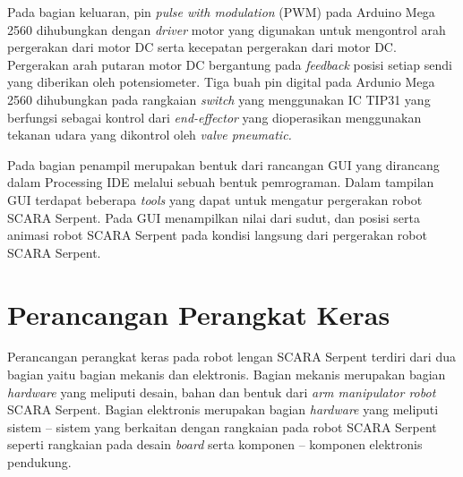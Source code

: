 Pada bagian keluaran, pin \textit{pulse with modulation} (PWM) pada Arduino Mega 2560 dihubungkan dengan \textit{driver} motor yang digunakan untuk mengontrol arah pergerakan dari motor DC serta kecepatan pergerakan dari motor DC. Pergerakan arah putaran motor DC bergantung pada \textit{feedback} posisi setiap sendi yang diberikan oleh potensiometer. Tiga buah pin digital pada Ardunio Mega 2560 dihubungkan pada rangkaian \textit{switch} yang menggunakan IC TIP31 yang berfungsi sebagai kontrol dari \textit{end-effector} yang dioperasikan menggunakan tekanan udara yang dikontrol oleh \textit{valve pneumatic.}

Pada bagian penampil merupakan bentuk dari rancangan GUI yang dirancang dalam Processing IDE melalui sebuah bentuk pemrograman. Dalam tampilan GUI terdapat beberapa \textit{tools} yang dapat untuk mengatur pergerakan robot SCARA Serpent. Pada GUI menampilkan nilai dari sudut, dan posisi serta animasi robot SCARA Serpent pada kondisi langsung dari pergerakan robot SCARA Serpent.
\section{ Perancangan Perangkat Keras }
Perancangan perangkat keras pada robot lengan SCARA Serpent terdiri dari dua bagian yaitu bagian mekanis dan elektronis. Bagian  mekanis merupakan bagian \textit{hardware} yang meliputi desain, bahan dan bentuk dari\textit{ arm manipulator robot} SCARA Serpent. Bagian elektronis merupakan bagian \textit{hardware} yang meliputi sistem – sistem yang berkaitan dengan rangkaian pada robot SCARA Serpent seperti rangkaian pada desain \textit{board} serta komponen – komponen elektronis pendukung.
